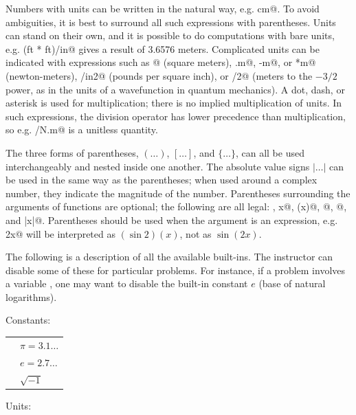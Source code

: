 \documentclass{doc}
\begin{document}
Numbers with units can be written in the natural way, e.g.  cm@. To avoid
ambiguities, it is best to surround all such expressions with parentheses.
Units can stand on their own, and it is possible to do computations with
bare units, e.g. \verb@(ft * ft)/in@ gives a result of 3.6576 meters.
Complicated units can be indicated with expressions such as
@ (square meters), \verb@N.m@, \verb@N-m@, or \verb@N*m@ (newton-meters), 
\verb@lb/in2@ (pounds per square inch), or
/2@ (meters to the $-3/2$ power, as in the units of a
wavefunction in quantum mechanics). A dot, dash, or asterisk is used for multiplication; there
is no implied multiplication of units.
In such expressions, the division
operator has lower precedence than multiplication, so e.g. \verb@J/N.m@ is
a unitless quantity.

The three forms of parentheses, $(\ldots)$, $[\ldots]$, and $\{\ldots\}$, can all be used
interchangeably and nested inside one another. The absolute value
signs $|\ldots|$ can be used in the same way as the parentheses; when
used around a complex number, they indicate the magnitude of the number.
Parentheses surrounding the arguments of functions are optional; the following
are all legal: \verb@sinx@, \verb@sin x@, \verb@sin(x)@, \verb@sin[x]@, @, and
\verb@sin|x|@. Parentheses should be used when the argument is an expression, e.g.
\verb@sin 2x@ will be interpreted as $(\sin 2)(x)$, not as $\sin(2x)$.

The following is a description of all the available built-ins.
The instructor can disable some of these for particular problems. For instance,
if a problem involves a variable \verb@e@, one may want to disable the built-in
constant $e$ (base of natural logarithms).

\noindent Constants:

\begin{tabular}{ll}
\verb@pi@	& $\pi=3.1\ldots$\\
\verb@e@	& $e=2.7\ldots$\\
\verb@i@	& $\sqrt{-1}$
\end{tabular}

\noindent Units:
\end{document}
